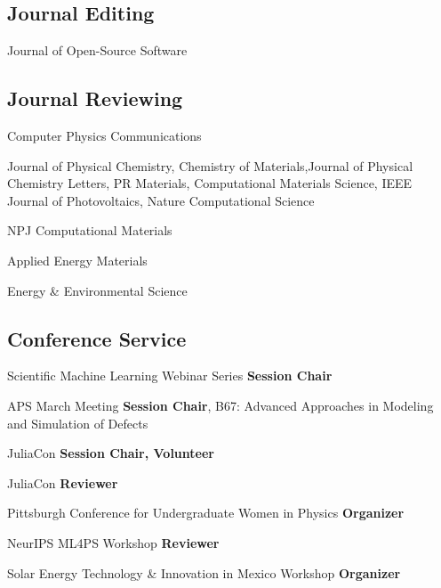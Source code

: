 \subsection{Journal Editing}
{}
{Journal of Open-Source Software}
{}

\vspace{-2mm}
\subsection{Journal Reviewing}
{}
{Computer Physics Communications}
{}

{}
{Journal of Physical Chemistry, Chemistry of Materials,Journal of Physical Chemistry Letters, PR Materials, Computational Materials Science, IEEE Journal of Photovoltaics, Nature Computational Science}
{}

{}
{NPJ Computational Materials}
{}

{}
{Applied Energy Materials}
{}

{}
{Energy \& Environmental Science}
{}

\vspace{-2mm}
\subsection{Conference Service}
{Scientific Machine Learning Webinar Series}
{\textbf{Session Chair}}
{}

{APS March Meeting}
{\textbf{Session Chair}, B67: Advanced Approaches in Modeling and Simulation of Defects}
{}
\vspace{1mm}

{JuliaCon}
{\textbf{Session Chair, Volunteer}}
{}

{JuliaCon}
{\textbf{Reviewer}}
{}

{Pittsburgh Conference for Undergraduate Women in Physics}
{\textbf{Organizer}}
{}

{NeurIPS ML4PS Workshop}
{\textbf{Reviewer}}
{}

{Solar Energy Technology \& Innovation in Mexico Workshop}
{\textbf{Organizer}}
{}

